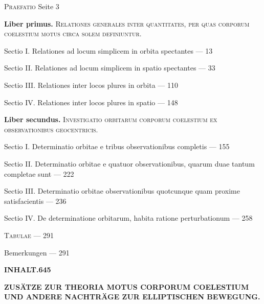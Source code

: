 \documentclass[10pt,a4paper]{article}
\newenvironment{hangparas}[2]{\setlength{\hangindent}{#1}\setlength{\hangafter}{#2}}{}
\begin{document}
\begin{hangparas}{1em}{1}
\noindent\textsc{Praefatio} \dotfill Seite 3

\vspace{0.3em}

\noindent\textbf{Liber primus.} \textsc{Relationes generales inter quantitates, per quas corporum coelestium motus circa solem definiuntur.}

\noindent\quad Sectio I. Relationes ad locum simplicem in orbita spectantes \dotfill --- 13

\noindent\quad Sectio II. Relationes ad locum simplicem in spatio spectantes \dotfill --- 33

\noindent\quad Sectio III. Relationes inter locos plures in orbita \dotfill --- 110

\noindent\quad Sectio IV. Relationes inter locos plures in spatio \dotfill --- 148

\vspace{0.3em}

\noindent\textbf{Liber secundus.} \textsc{Investigatio orbitarum corporum coelestium ex observationibus geocentricis.}

\noindent\quad Sectio I. Determinatio orbitae e tribus observationibus completis \dotfill --- 155

\noindent\quad Sectio II. Determinatio orbitae e quatuor observationibus, quarum duae tantum completae sunt \dotfill --- 222

\noindent\quad Sectio III. Determinatio orbitae observationibus quotcunque quam proxime satisfacientis \dotfill --- 236

\noindent\quad Sectio IV. De determinatione orbitarum, habita ratione perturbationum \dotfill --- 258

\vspace{0.3em}

\noindent\textsc{Tabulae} \dotfill --- 291

\vspace{0.5em}

\noindent Bemerkungen \dotfill --- 291
\end{hangparas}

\newpage

\begin{center}
\Large\textbf{INHALT.}\hfill\textbf{645}
\end{center}

\vspace{0.5em}

\begin{center}
\textbf{ZUSÄTZE ZUR THEORIA MOTUS CORPORUM COELESTIUM}\\
\textbf{UND ANDERE NACHTRÄGE ZUR ELLIPTISCHEN BEWEGUNG.}
\end{center}
\end{document}
